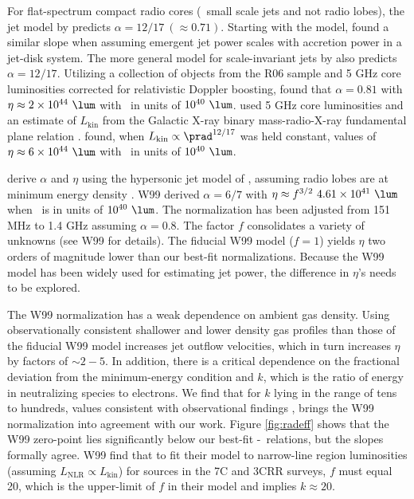 \documentclass{emulateapj}
\begin{document}
For flat-spectrum compact radio cores (\eg\ small scale jets and not
radio lobes), the jet model by \citet{1979ApJ...232...34B} predicts
$\alpha = 12/17~(\approx 0.71)$. Starting with the
\citet{1979ApJ...232...34B} model, \citet{1995A&A...293..665F} found a
similar slope when assuming emergent jet power scales with accretion
power in a jet-disk system. The more general model for scale-invariant
jets by \citet{2003MNRAS.343L..59H} also predicts $\alpha =
12/17$. Utilizing a collection of objects from the R06 sample and 5
GHz core luminosities corrected for relativistic Doppler boosting,
\citet{2007MNRAS.381..589M} found that $\alpha = 0.81$ with $\eta
\approx 2\times10^{44} ~\lum$ with \prad\ in units of $10^{40} ~\lum$.
\citet{2005ApJ...633..384H} used 5 GHz core luminosities and an
estimate of $L_{\mathrm{kin}}$ from the Galactic X-ray binary
mass-radio-X-ray fundamental plane relation
\citep{2003MNRAS.344...60G,
  2003MNRAS.345.1057M}. \citet{2005ApJ...633..384H} found, when
$L_{\mathrm{kin}} \propto \prad^{12/17}$ was held constant, values of
$\eta \approx 6\times10^{44} ~\lum$ with \prad\ in units of $10^{40}
~\lum$.

\citet[][hereafter W99]{1999MNRAS.309.1017W} derive $\alpha$ and
$\eta$ using the hypersonic jet model of \citet{1991MNRAS.250..581F},
assuming radio lobes are at minimum energy density \citep[see][for
details]{1980ARA&A..18..165M}. W99 derived $\alpha = 6/7$ with $\eta
\approx f^{3/2}~4.61\times10^{41} ~\lum$ when \prad\ is in units of
$10^{40} ~\lum$. The normalization has been adjusted from 151 MHz to
1.4 GHz assuming $\alpha = 0.8$. The factor $f$ consolidates a variety
of unknowns (see W99 for details). The fiducial W99 model ($f=1$)
yields $\eta$ two orders of magnitude lower than our best-fit
normalizations. Because the W99 model has been widely used for
estimating jet power, the difference in $\eta$'s needs to be explored.

The W99 normalization has a weak dependence on ambient gas density.
Using observationally consistent shallower and lower density gas
profiles than those of the fiducial W99 model increases jet outflow
velocities, which in turn increases $\eta$ by factors of $\sim
2-5$. In addition, there is a critical dependence on the fractional
deviation from the minimum-energy condition and $k$, which is the
ratio of energy in neutralizing species to electrons. We find that for
$k$ lying in the range of tens to hundreds, values consistent with
observational findings \citep{2005MNRAS.364.1343D,
2006MNRAS.372.1741D, 2006ApJ...648..200D, birzan08}, brings the W99
normalization into agreement with our work. Figure \ref{fig:radeff}
shows that the W99 zero-point lies significantly below our best-fit
\pjet-\prad\ relations, but the slopes formally agree. W99 find that
to fit their model to narrow-line region luminosities (assuming
$L_{\mathrm{NLR}} \propto L_{\mathrm{kin}}$) for sources in the 7C and
3CRR surveys, $f$ must equal 20, which is the upper-limit of $f$ in
their model and implies $k \approx 20$.
\end{document}
